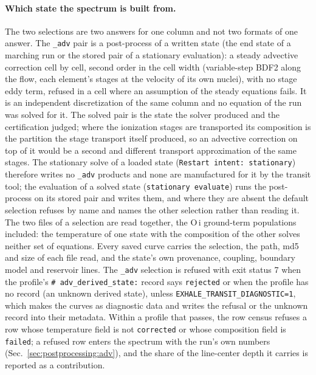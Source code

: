 \paragraph{Which state the spectrum is built from.}
The two selections are two answers for one column and not two formats of one
answer.  The \texttt{\_adv} pair is a post-process of a written state (the
end state of a marching run or the stored pair of a stationary evaluation): a
steady advective correction cell by cell, second order in the cell width
(variable-step BDF2 along the flow, each element's stages at the velocity of
its own nuclei), with no stage eddy term, refused in a cell where an
assumption of the steady equations fails.  It is an independent
discretization of the same column and no equation of the run was solved for
it.  The solved pair is the state the solver produced and the certification
judged; where the ionization stages are transported its composition is the
partition the stage transport itself produced, so an advective correction on
top of it would be a second and different transport approximation of the same
stages.  The stationary solve of a loaded state (\texttt{Restart intent:
stationary}) therefore writes no \texttt{\_adv} products and none are
manufactured for it by the transit tool; the evaluation of a solved state
(\texttt{stationary evaluate}) runs the post-process on its stored pair and
writes them, and where they are absent the default selection refuses by name
and names the other selection rather than reading it.  The two files of a
selection are read together, the O\,{\sc i} ground-term populations
included: the temperature of one state with the composition of the other
solves neither set of equations.  Every saved curve carries the selection,
the path, md5 and size of each file read, and the state's own provenance,
coupling, boundary model and reservoir lines.  The \texttt{\_adv}
selection is refused with exit status 7 when the profile's
\texttt{\# adv\_derived\_state:} record says \texttt{rejected} or when the
profile has no record (an unknown derived state), unless
\texttt{EXHALE\_TRANSIT\_DIAGNOSTIC=1}, which makes the curves as diagnostic
data and writes the refusal or the unknown record into their metadata.
Within a profile that passes, the row census refuses a row whose
temperature field is not \texttt{corrected} or whose composition field is
\texttt{failed}; a refused row enters the spectrum with the run's own
numbers (Sec.~\ref{sec:postprocessing:adv}), and the share of the
line-center depth it carries is reported as a contribution.

